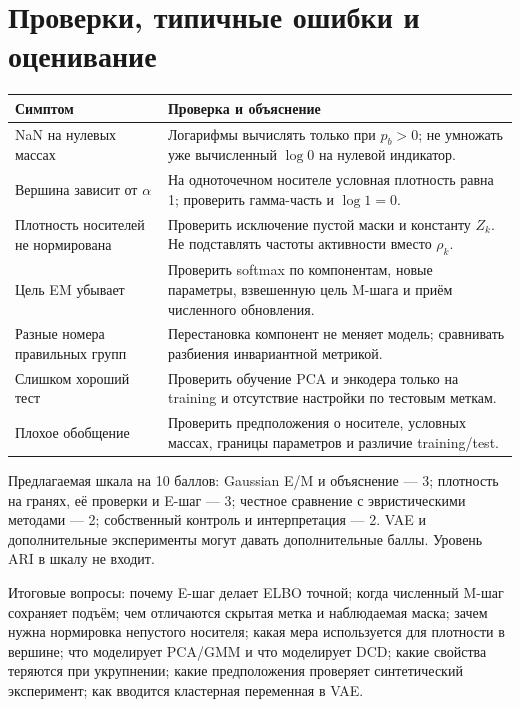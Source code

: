 \documentclass[11pt,a4paper]{article}
\begin{document}
\clearpage
\section{Проверки, типичные ошибки и оценивание}

\begin{center}
\begin{tabular}{p{.34\linewidth}p{.59\linewidth}}
\toprule
Симптом & Проверка и объяснение\\
\midrule
NaN на нулевых массах & Логарифмы вычислять только при $p_b>0$;
не умножать уже вычисленный $\log0$ на нулевой индикатор.\\[3pt]
Вершина зависит от $\alpha$ & На одноточечном носителе условная плотность
равна 1; проверить гамма-часть и $\log1=0$.\\[3pt]
Плотность носителей не нормирована & Проверить исключение пустой маски
и константу $Z_k$. Не подставлять частоты активности вместо $\rho_k$.\\[3pt]
Цель EM убывает & Проверить softmax по компонентам, новые параметры,
взвешенную цель M-шага и приём численного обновления.\\[3pt]
Разные номера правильных групп & Перестановка компонент не меняет модель;
сравнивать разбиения инвариантной метрикой.\\[3pt]
Слишком хороший тест & Проверить обучение PCA и энкодера только на training
и отсутствие настройки по тестовым меткам.\\[3pt]
Плохое обобщение & Проверить предположения о носителе, условных массах,
границы параметров и различие training/test.\\
\bottomrule
\end{tabular}
\end{center}

Предлагаемая шкала на 10 баллов: Gaussian E/M и объяснение --- 3;
плотность на гранях, её проверки и E-шаг --- 3; честное сравнение с
эвристическими методами --- 2; собственный контроль и интерпретация --- 2.
VAE и дополнительные эксперименты могут давать дополнительные баллы.
Уровень ARI в шкалу не входит.

Итоговые вопросы: почему E-шаг делает ELBO точной; когда численный
M-шаг сохраняет подъём; чем отличаются скрытая метка и наблюдаемая маска;
зачем нужна нормировка непустого носителя; какая мера используется
для плотности в вершине; что моделирует PCA/GMM и что моделирует DCD;
какие свойства теряются при укрупнении; какие предположения проверяет
синтетический эксперимент; как вводится кластерная переменная в VAE.
\end{document}
